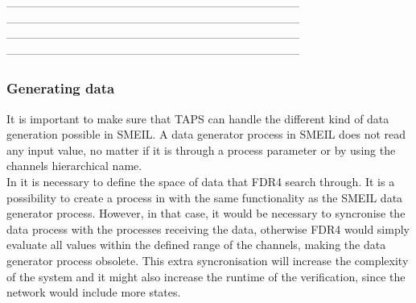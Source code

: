 ------------------------------------------------------------------------------\\
------------------------------------------------------------------------------\\
------------------------------------------------------------------------------\\
------------------------------------------------------------------------------\\

\subsubsection{Generating data}
It is important to make sure that TAPS can handle the different kind of data generation possible in SMEIL. A data generator process in SMEIL does not read any input value, no matter if it is through a process parameter or by using the channels hierarchical name. \\

In \cspm it is necessary to define the space of data that FDR4 search through. It is a possibility to create a process in \cspm with the same functionality as the SMEIL data generator process. However, in that case, it would be necessary to syncronise the data process with the processes receiving the data, otherwise FDR4 would simply evaluate all values within the defined range of the channels, making the data generator process obsolete. This extra syncronisation will increase the complexity of the system and it might also increase the runtime of the verification, since the \cspm{} network would include more states.

